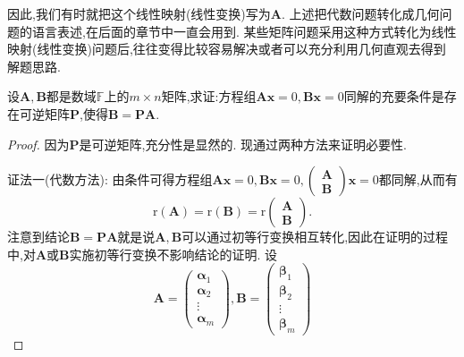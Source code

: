 \documentclass[../../main.tex]{subfiles}%
\begin{document}
因此,我们有时就把这个线性映射(线性变换)写为\(\boldsymbol{A}\). 上述把代数问题转化成几何问题的语言表述,在后面的章节中一直会用到. 某些矩阵问题采用这种方式转化为线性映射(线性变换)问题后,往往变得比较容易解决或者可以充分利用几何直观去得到解题思路.
\begin{example}
设\(\boldsymbol{A},\boldsymbol{B}\)都是数域\(\mathbb{F}\)上的\(m\times n\)矩阵,求证:方程组\(\boldsymbol{A}\boldsymbol{x}=0,\boldsymbol{B}\boldsymbol{x}=0\)同解的充要条件是存在可逆矩阵\(\boldsymbol{P}\),使得\(\boldsymbol{B}=\boldsymbol{P}\boldsymbol{A}\).
\end{example}
\begin{proof}
因为\(\boldsymbol{P}\)是可逆矩阵,充分性是显然的. 现通过两种方法来证明必要性.

{\color{blue}证法一(代数方法):} 由条件可得方程组\(\boldsymbol{A}\boldsymbol{x}=0,\boldsymbol{B}\boldsymbol{x}=0,\begin{pmatrix}\boldsymbol{A}\\\boldsymbol{B}\end{pmatrix}\boldsymbol{x}=0\)都同解,从而有
\[
\text{r}(\boldsymbol{A})=\text{r}(\boldsymbol{B})=\text{r}\begin{pmatrix}\boldsymbol{A}\\\boldsymbol{B}\end{pmatrix}.
\]
注意到结论\(\boldsymbol{B}=\boldsymbol{P}\boldsymbol{A}\)就是说\(\boldsymbol{A},\boldsymbol{B}\)可以通过初等行变换相互转化,因此在证明的过程中,对\(\boldsymbol{A}\)或\(\boldsymbol{B}\)实施初等行变换不影响结论的证明. 设
\[
\boldsymbol{A}=\begin{pmatrix}\boldsymbol{\alpha}_1\\\boldsymbol{\alpha}_2\\\vdots\\\boldsymbol{\alpha}_m\end{pmatrix},\boldsymbol{B}=\begin{pmatrix}\boldsymbol{\beta}_1\\\boldsymbol{\beta}_2\\\vdots\\\boldsymbol{\beta}_m\end{pmatrix}
\]

\end{proof}
\end{document}
